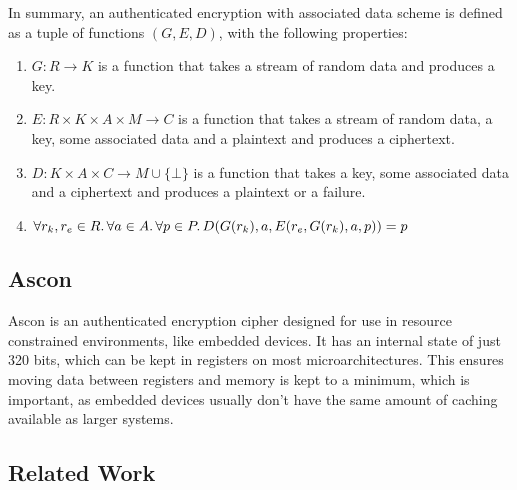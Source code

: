 In summary, an authenticated encryption with associated data scheme is defined
as a tuple of functions $(G, E, D)$, with the following properties:

\begin{enumerate}
    \item $G \colon R \to K$ is a function that takes a stream of random data and
        produces a key.
    \item $E \colon R \times K \times A \times M \to C$ is a function that takes
        a stream of random data, a key, some associated data and a plaintext and
        produces a ciphertext.
    \item $D \colon K \times A \times C \to M \cup \{ \bot \}$ is a function
        that takes a key, some associated data and a ciphertext and produces a
        plaintext or a failure.
    \item $\forall r_k, r_e \in R\ldotp \forall a \in A\ldotp
        \forall p \in P\ldotp D(G(r_k), a, E(r_e, G(r_k), a, p)) = p$ 
\end{enumerate}

\subsection{Ascon}

Ascon\cite{ascon} is an authenticated encryption cipher designed for use in
resource constrained environments, like embedded devices. It has an internal
state of just 320 bits, which can be kept in registers on most
microarchitectures. This ensures moving data between registers and memory is
kept to a minimum, which is important, as embedded devices usually don't have
the same amount of caching available as larger systems.

\subsection{Related Work}
